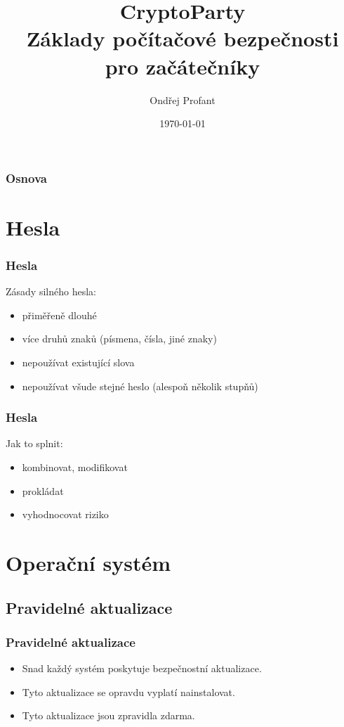 \documentclass[xetex]{beamer}
\title{CryptoParty\\Základy počítačové bezpečnosti\\pro začátečníky}
\author{Ondřej Profant}
\institute[Piráti]{Česká pirátská strana}
\date{\today}
\begin{document}
\begin{frame}
  \titlepage
\end{frame}

\begin{frame}
  \frametitle{Osnova}
  \tableofcontents
\end{frame}	

\section{Hesla}


\begin{frame}
 \frametitle{Hesla}
 Zásady silného hesla:
 \begin{itemize} 
   \item přiměřeně dlouhé
   \item více druhů znaků (písmena, čísla, jiné znaky)
   \item nepoužívat existující slova 
   \item nepoužívat všude stejné heslo (alespoň několik stupňů)
 \end{itemize}
\end{frame}


\begin{frame}
 \frametitle{Hesla}
 Jak to splnit:
 \begin{itemize} 
   \item kombinovat, modifikovat
   \item prokládat
   \item vyhodnocovat riziko
 \end{itemize} 
\end{frame}

\section{Operační systém}

\subsection{Pravidelné aktualizace}

\begin{frame}
	\frametitle{Pravidelné aktualizace} 
	\begin{itemize}
		\item Snad každý systém poskytuje bezpečnostní aktualizace.
		\item Tyto aktualizace se opravdu vyplatí nainstalovat.
		\item Tyto aktualizace jsou zpravidla zdarma.
	\end{itemize}
\end{frame}
\end{document}
